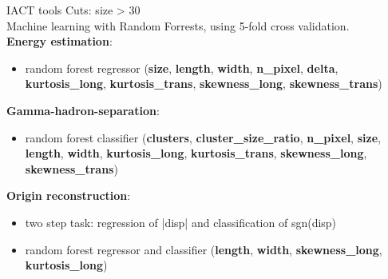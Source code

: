 \begin{frame}{IACT tools}
  Cuts: size > 30 \\
  Machine learning with Random Forrests, using 5-fold cross validation.\\
  \textbf{{\color{tugreen} Energy estimation}}:
  \begin{itemize}
      \item random forest regressor (\textbf{size}, \textbf{length}, \textbf{width}, \textbf{n\_pixel}, \textbf{delta}, \textbf{kurtosis\_long}, \textbf{kurtosis\_trans}, \textbf{skewness\_long}, \textbf{skewness\_trans})
  \end{itemize}
  \textbf{{\color{tugreen} Gamma-hadron-separation}}:
  \begin{itemize}
      \item random forest classifier (\textbf{clusters}, \textbf{cluster\_size\_ratio}, \textbf{n\_pixel}, \textbf{size}, \textbf{length}, \textbf{width}, \textbf{kurtosis\_long}, \textbf{kurtosis\_trans}, \textbf{skewness\_long}, \textbf{skewness\_trans})
  \end{itemize}
  \textbf{{\color{tugreen} Origin reconstruction}}:
  \begin{itemize}
      \item two step task: regression of |disp| and classification of sgn(disp)
      \item random forest regressor and classifier (\textbf{length}, \textbf{width}, \textbf{skewness\_long}, \textbf{kurtosis\_long})
  \end{itemize}
\end{frame}

